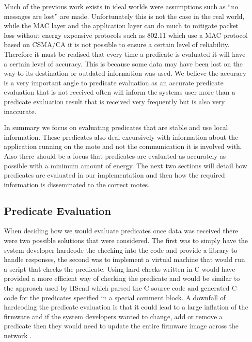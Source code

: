 Much of the previous work exists in ideal worlds were assumptions such as ``no messages are lost'' \cite{277788} are made. Unfortunately this is not the case in the real world, while the MAC layer and the application layer can do much to mitigate packet loss \cite{Buettner:2006:XSP:1182807.1182838} without energy expensive protocols such as 802.11 which use a MAC protocol based on CSMA/CA \cite{?} it is not possible to ensure a certain level of reliability. Therefore it must be realised that every time a predicate is evaluated it will have a certain level of accuracy. This is because some data may have been lost on the way to its destination or outdated information was used. We believe the accuracy is a very important angle to predicate evaluation as an accurate predicate evaluation that is not received often will inform the systems user more than a predicate evaluation result that is received very frequently but is also very inaccurate.

In summary we focus on evaluating predicates that are stable and use local information. These predicates also deal excursively with information about the application running on the mote and not the communication it is involved with. Also there should be a focus that predicates are evaluated as accurately as possible with a minimum amount of energy. The next two sections will detail how predicates are evaluated in our implementation and then how the required information is disseminated to the correct motes.

\subsection{Predicate Evaluation}

When deciding how we would evaluate predicates once data was received there were two possible solutions that were considered. The first was to simply have the system developer hardcode the checking into the code and provide a library to handle responses, the second was to implement a virtual machine that would run a script that checks the predicate. Using hard checks written in C would have provided a more efficient way of checking the predicate and would be similar to the approach used by HSend \cite{herbert2007adaptive} which parsed the C source code and generated C code for the predicates specified in a special comment block. A downfall of hardcoding the predicate evaluation is that it could lead to a large inflation of the firmware and if the system developers wanted to change, add or remove a predicate then they would need to update the entire firmware image across the network \cite{Dunkels:2006:RDL:1182807.1182810,1437066}.

